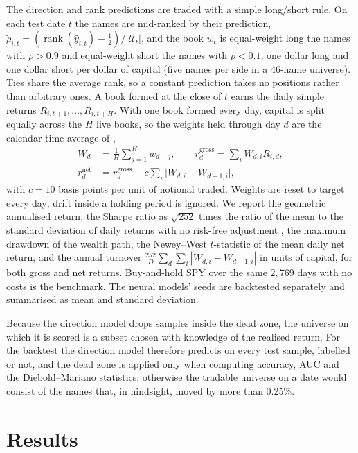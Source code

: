 \documentclass[10pt,a4paper,twoside,twocolumn]{article}
\DeclareMathOperator{\rank}{rank}
\begin{document}
The direction and rank predictions are traded with a simple long/short rule. On each test date $t$ the names are mid-ranked by their prediction, $\tilde\rho_{i,t}=(\rank(\hat y_{i,t})-\tfrac12)/|\mathcal{U}_t|$, and the book $w_{t}$ is equal-weight long the names with $\tilde\rho>0.9$ and equal-weight short the names with $\tilde\rho<0.1$, one dollar long and one dollar short per dollar of capital (five names per side in a 46-name universe). Ties share the average rank, so a constant prediction takes no positions rather than arbitrary ones. A book formed at the close of $t$ earns the daily simple returns $R_{i,t+1},\dots,R_{i,t+H}$. With one book formed every day, capital is split equally across the $H$ live books, so the weights held through day $d$ are the calendar-time average of \citet{jegadeesh1993returns},
\begin{align}
W_{d}&=\frac{1}{H}\sum_{j=1}^{H} w_{d-j},\qquad
r^{\text{gross}}_{d}=\sum_i W_{d,i}R_{i,d},\\
r^{\text{net}}_{d}&=r^{\text{gross}}_{d}-c\sum_i\big|W_{d,i}-W_{d-1,i}\big|,
\end{align}
with $c=10$ basis points per unit of notional traded. Weights are reset to target every day; drift inside a holding period is ignored. We report the geometric annualised return, the Sharpe ratio as $\sqrt{252}$ times the ratio of the mean to the standard deviation of daily returns with no risk-free adjustment \citep{lo2002statistics}, the maximum drawdown of the wealth path, the Newey--West $t$-statistic of the mean daily net return, and the annual turnover $\tfrac{252}{D}\sum_d\sum_i|W_{d,i}-W_{d-1,i}|$ in units of capital, for both gross and net returns. Buy-and-hold SPY over the same $2{,}769$ days with no costs is the benchmark. The neural models' seeds are backtested separately and summarised as mean and standard deviation.

Because the direction model drops samples inside the dead zone, the universe on which it is scored is a subset chosen with knowledge of the realised return. For the backtest the direction model therefore predicts on every test sample, labelled or not, and the dead zone is applied only when computing accuracy, AUC and the Diebold--Mariano statistics; otherwise the tradable universe on a date would consist of the names that, in hindsight, moved by more than 0.25\%.

\section{Results}\label{sec:results}
\end{document}

